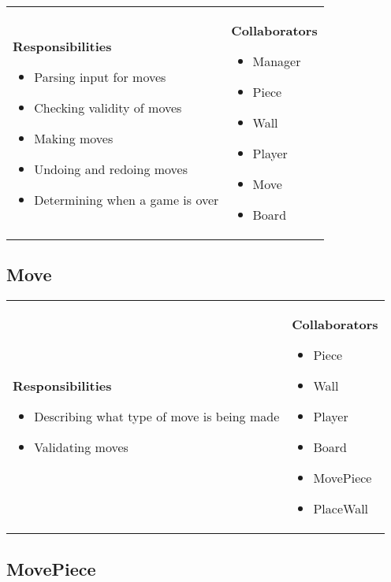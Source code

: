\documentclass[a4paper]{article}
\begin{document}
\begin{tabular}{p{9cm}p{3cm}}
    \textbf{Responsibilities}
    \begin{itemize}
    \item Parsing input for moves
    \item Checking validity of moves
    \item Making moves
    \item Undoing and redoing moves
    \item Determining when a game is over
    \end{itemize}
    &
    \textbf{Collaborators}
    \begin{itemize}
    \item Manager
    \item Piece
    \item Wall
    \item Player
    \item Move
    \item Board
    \end{itemize}
\end{tabular}


\subsection*{Move}

\begin{tabular}{p{9cm}p{3cm}}
    \textbf{Responsibilities}
    \begin{itemize}
    \item Describing what type of move is being made
    \item Validating moves
    \end{itemize}
    &
    \textbf{Collaborators}
    \begin{itemize}
    \item Piece
    \item Wall
    \item Player
    \item Board
    \item MovePiece
    \item PlaceWall
    \end{itemize}
\end{tabular}

\subsection*{MovePiece}
\end{document}
